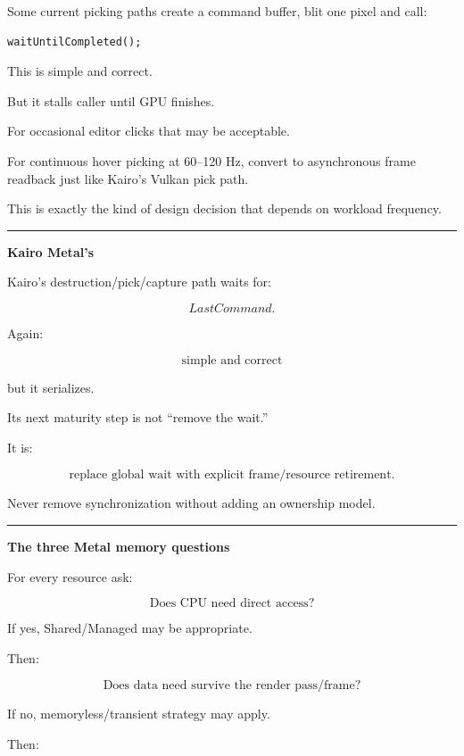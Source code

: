 Some current picking paths create a command buffer, blit one pixel and call:

\begin{verbatim}
waitUntilCompleted();
\end{verbatim}

This is simple and correct.

But it stalls caller until GPU finishes.

For occasional editor clicks that may be acceptable.

For continuous hover picking at 60--120 Hz, convert to asynchronous frame readback just like Kairo's Vulkan pick path.

This is exactly the kind of design decision that depends on workload frequency.

\begin{center}\rule{0.5\linewidth}{0.5pt}\end{center}

\textbf{Kairo Metal's }

Kairo's destruction/pick/capture path waits for:

\[
LastCommand.
\]

Again:

\[
\boxed{
\text{simple and correct}
}
\]

but it serializes.

Its next maturity step is not ``remove the wait.''

It is:

\[
\boxed{
\text{replace global wait with explicit frame/resource retirement}.
}
\]

Never remove synchronization without adding an ownership model.

\begin{center}\rule{0.5\linewidth}{0.5pt}\end{center}

\textbf{The three Metal memory questions}

For every resource ask:

\[
\boxed{
\text{Does CPU need direct access?}
}
\]

If yes, Shared/Managed may be appropriate.

Then:

\[
\boxed{
\text{Does data need survive the render pass/frame?}
}
\]

If no, memoryless/transient strategy may apply.

Then:

